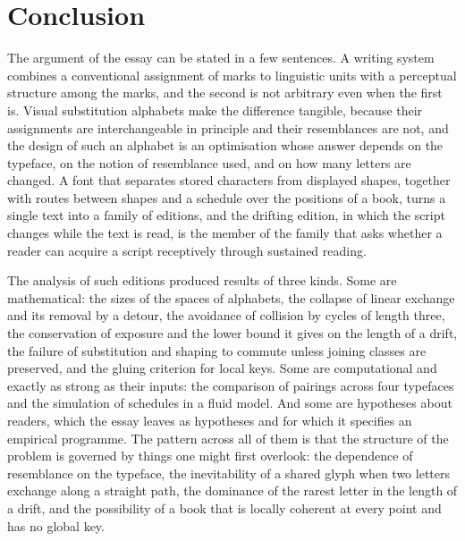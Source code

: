 \section{Conclusion}\label{sec:concl}

The argument of the essay can be stated in a few sentences. A writing system combines a conventional assignment of marks to linguistic units with a perceptual structure among the marks, and the second is not arbitrary even when the first is. Visual substitution alphabets make the difference tangible, because their assignments are interchangeable in principle and their resemblances are not, and the design of such an alphabet is an optimisation whose answer depends on the typeface, on the notion of resemblance used, and on how many letters are changed. A font that separates stored characters from displayed shapes, together with routes between shapes and a schedule over the positions of a book, turns a single text into a family of editions, and the drifting edition, in which the script changes while the text is read, is the member of the family that asks whether a reader can acquire a script receptively through sustained reading.

The analysis of such editions produced results of three kinds. Some are mathematical: the sizes of the spaces of alphabets, the collapse of linear exchange and its removal by a detour, the avoidance of collision by cycles of length three, the conservation of exposure and the lower bound it gives on the length of a drift, the failure of substitution and shaping to commute unless joining classes are preserved, and the gluing criterion for local keys. Some are computational and exactly as strong as their inputs: the comparison of pairings across four typefaces and the simulation of schedules in a fluid model. And some are hypotheses about readers, which the essay leaves as hypotheses and for which it specifies an empirical programme. The pattern across all of them is that the structure of the problem is governed by things one might first overlook: the dependence of resemblance on the typeface, the inevitability of a shared glyph when two letters exchange along a straight path, the dominance of the rarest letter in the length of a drift, and the possibility of a book that is locally coherent at every point and has no global key.

